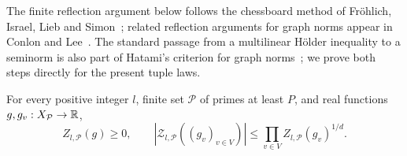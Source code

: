 The finite reflection argument below follows the chessboard method of
Fr\"ohlich, Israel, Lieb and Simon~\cite[Theorem~4.1]{FILS1978};
related reflection arguments for graph norms appear in Conlon and
Lee~\cite[Section~3]{ConlonLee2017}.
The standard passage from a multilinear H\"older inequality to a seminorm
is also part of Hatami's criterion for graph norms~\cite[Theorem~2.8 of
the arXiv version]{Hatami2010}; we prove both steps directly for the
present tuple laws.

\begin{proposition}
\label{lift:signed-holder}
For every positive integer \(l\), finite set \(\mathcal P\) of primes
at least \(P\), and real functions \(g,g_v:X_{\mathcal P}\to\mathbb R\),
\begin{equation}
 Z_{l,\mathcal P}(g)\ge0,
 \qquad
 \left|\mathcal Z_{l,\mathcal P}((g_v)_{v\in V})\right|
 \le\prod_{v\in V} Z_{l,\mathcal P}(g_v)^{1/d}.
 \label{eq:10}
\end{equation}
\end{proposition}

